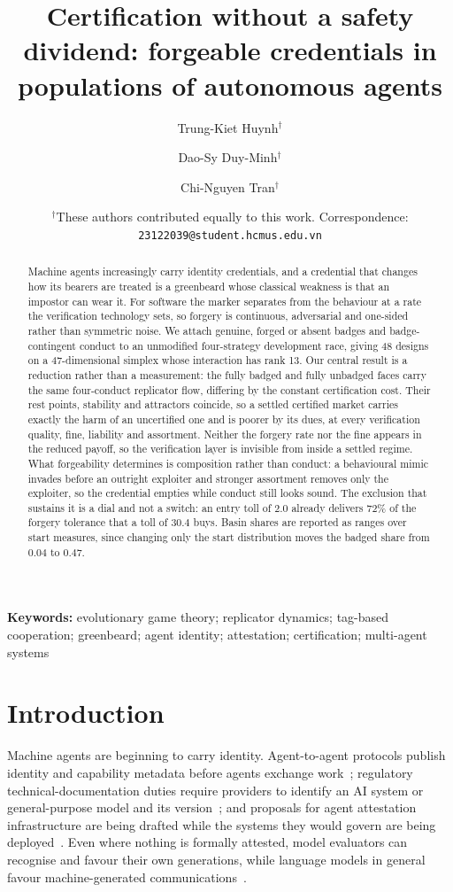 \documentclass[11pt,a4paper]{article}
\title{\bfseries Certification without a safety dividend: forgeable credentials
in populations of autonomous agents}
\author[1,2]{Trung-Kiet Huynh$^{\dagger}$}
\author[1,2]{Dao-Sy Duy-Minh$^{\dagger}$}
\author[1,2]{Chi-Nguyen Tran$^{\dagger}$}
\affil[1]{Faculty of Information Technology, University of Science (HCMUS), Ho Chi Minh City, Vietnam}\affil[2]{Vietnam National University -- Ho Chi Minh City (VNU-HCM), Ho Chi Minh City, Vietnam}
\date{\normalsize $^{\dagger}$These authors contributed equally to this work. Correspondence: \texttt{23122039@student.hcmus.edu.vn}}
\theoremstyle{definition}
\begin{document}
\maketitle

\begin{abstract}
\noindent
Machine agents increasingly carry identity credentials, and a credential that
changes how its bearers are treated is a greenbeard whose classical weakness is
that an impostor can wear it. For software the marker separates from the
behaviour at a rate the verification technology sets, so forgery is continuous,
adversarial and one-sided rather than symmetric noise. We attach genuine,
forged or absent badges and badge-contingent conduct to an unmodified
four-strategy development race, giving 48 designs on a 47-dimensional simplex
whose interaction has rank 13. Our central result is a reduction rather than a
measurement: the fully badged and fully unbadged faces carry the same
four-conduct replicator flow, differing by the constant certification cost.
Their rest points, stability and attractors coincide, so a settled certified
market carries exactly the harm of an uncertified one and is poorer by its
dues, at every verification quality, fine, liability and assortment.
Neither the forgery rate nor the fine appears in the reduced payoff, so the
verification layer is invisible from inside a settled regime. What forgeability
determines is composition rather than conduct: a behavioural mimic invades
before an outright exploiter and stronger assortment removes only the
exploiter, so the credential empties while conduct still looks sound. The
exclusion that sustains it is a dial and not a switch: an entry toll of $2.0$
already delivers $72\%$ of the forgery tolerance that a toll of $30.4$ buys.
Basin shares
are reported as ranges over start measures, since changing only the start
distribution moves the badged share from $0.04$ to $0.47$.
\end{abstract}

\noindent\textbf{Keywords:} evolutionary game theory; replicator dynamics;
tag-based cooperation; greenbeard; agent identity; attestation; certification;
multi-agent systems

\section{Introduction}
\label{sec:intro}

Machine agents are beginning to carry identity. Agent-to-agent protocols
publish identity and capability metadata before agents exchange
work~\citep{a2a2026spec}; regulatory technical-documentation duties require
providers to identify an AI system or general-purpose model and its
version~\citep{euaiact2024}; and proposals for agent attestation
infrastructure are being drafted while the systems they would govern are being
deployed~\citep{chan2024visibility,chan2025infrastructure,shavit2023practices}.
Even where nothing is formally attested, model evaluators can recognise and
favour their own generations, while language models in general favour
machine-generated communications~\citep{panickssery2024llm,laurito2025aiai}.
\end{document}
